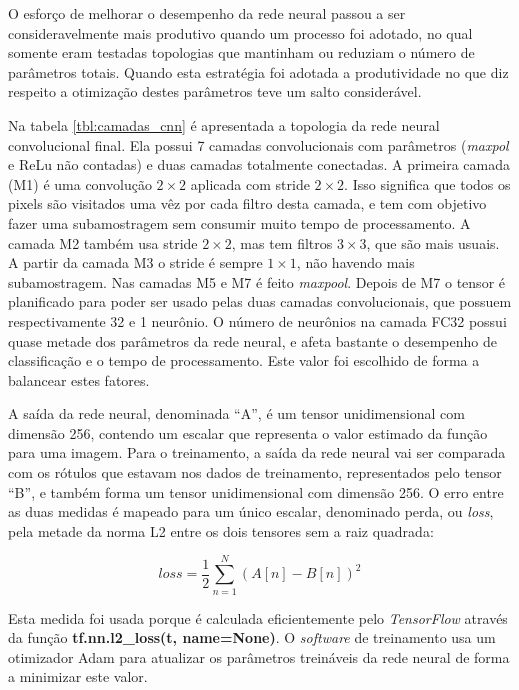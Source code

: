 O esforço de melhorar o desempenho da rede neural passou a ser
consideravelmente mais produtivo quando um processo foi adotado, no qual
somente eram testadas topologias que mantinham ou reduziam o número de
parâmetros totais. Quando esta estratégia foi adotada a produtividade no
que diz respeito a otimização destes parâmetros teve um salto considerável.

Na tabela \ref{tbl:camadas_cnn} é apresentada a topologia da rede neural
convolucional final. Ela possui 7 camadas convolucionais com parâmetros
(\emph{maxpol} e ReLu não contadas) e duas camadas totalmente conectadas. A
primeira camada (M1) é uma convolução $2 \times 2$ aplicada com stride $2
\times 2$. Isso significa que todos os pixels são visitados uma vêz por
cada filtro desta camada, e tem com objetivo fazer uma subamostragem sem
consumir muito tempo de processamento. A camada M2 também usa stride $2 \times
2$, mas tem filtros $3 \times 3$, que são mais usuais. A partir da camada M3 o
stride é sempre $1 \times 1$, não havendo mais subamostragem. Nas camadas M5 e
M7 é feito \emph{maxpool}. Depois de M7 o tensor é planificado para poder ser
usado pelas duas camadas convolucionais, que possuem respectivamente 32 e 1
neurônio. O número de neurônios na camada FC32 possui quase metade dos
parâmetros da rede neural, e afeta bastante o desempenho de
classificação e o tempo de processamento. Este valor foi escolhido de forma a
balancear estes fatores.

A saída da rede neural, denominada ``A'', é um tensor unidimensional com
dimensão 256, contendo um escalar que representa o valor estimado da função
para uma imagem. Para o treinamento, a saída
da rede neural vai ser comparada com os rótulos que estavam nos dados de
treinamento, representados pelo tensor ``B'', e também forma um tensor
unidimensional com dimensão 256. O erro entre as duas medidas é mapeado para
um único escalar, denominado perda, ou \emph{loss}, pela metade da norma
L2 entre os dois tensores sem a raiz quadrada:

\begin{equation}
	loss=\frac{1}{2} \sum_{n=1}^N \left( A[n] - B[n] \right)^2
\end{equation}

Esta medida foi usada porque é calculada eficientemente pelo \emph{TensorFlow}
através da função \textbf{tf.nn.l2\_loss(t, name=None)}. O \emph{software} de
treinamento usa um otimizador
Adam \cite{kingma2014adam} para atualizar os parâmetros treináveis da rede
neural de forma a minimizar este valor.

